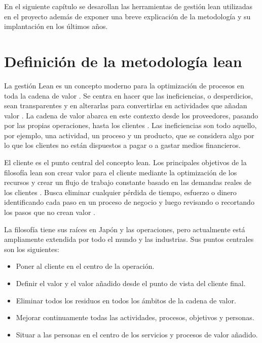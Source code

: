 En el siguiente capítulo se desarollan las herramientas de gestión lean utilizadas en el proyecto además de exponer una breve explicación de la metodología y su implantación en los últimos años.

\section{Definición de la metodología lean}

La gestión Lean es un concepto moderno para la optimización de procesos en toda la cadena de valor \cite{helmold_progress_2019}.
Se centra en hacer que las ineficiencias, o desperdicios, sean transparentes y en alterarlas para convertirlas en actividades que añadan valor \cite{helmold_global_2016}.
La cadena de valor abarca en este contexto desde los proveedores, pasando por las propias operaciones, hasta los clientes \cite{slack_operations_2010}.
Las ineficiencias son todo aquello, por ejemplo, una actividad, un proceso y un producto, que se considera algo por lo que los clientes no están dispuestos a pagar o a gastar medios financieros.

El cliente es el punto central del concepto lean.
Los principales objetivos de la filosofía lean son crear valor para el cliente mediante la optimización de los recursos y crear un flujo de trabajo constante basado en las demandas reales de los clientes \cite{ohno_toyota_1988}. Busca eliminar cualquier pérdida de tiempo, esfuerzo o dinero identificando cada paso en un proceso de negocio y luego revisando o recortando los pasos que no crean valor \cite{bertagnolli_lean_2018}.

La filosofía tiene sus raíces en Japón y las operaciones, pero actualmente está ampliamente extendida por todo el mundo y las industrias.
Sus puntos centrales son los siguientes:

\begin{itemize}
    \item Poner al cliente en el centro de la operación.
    \item Definir el valor y el valor añadido desde el punto de vista del cliente final.
    \item Eliminar todos los residuos en todos los ámbitos de la cadena de valor.
    \item Mejorar continuamente todas las actividades, procesos, objetivos y personas.
    \item Situar a las personas en el centro de los servicios y procesos de valor añadido.
\end{itemize}

